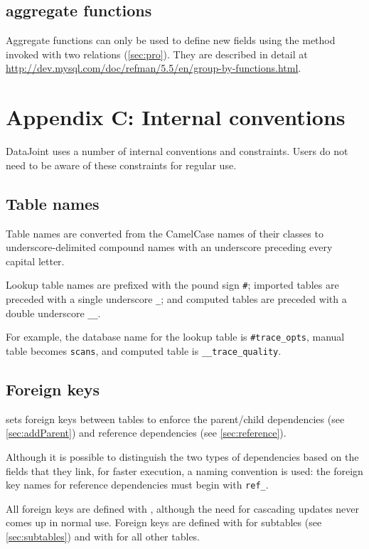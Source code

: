 \documentclass[10pt]{article}
\begin{document}
\subsection{aggregate functions}
Aggregate functions can only be used to define new fields using the  method invoked with two relations (\autoref{sec:pro}).  They are described in detail at \url{http://dev.mysql.com/doc/refman/5.5/en/group-by-functions.html}.

\newpage\section{Appendix C: Internal conventions}
DataJoint uses a number of internal conventions and constraints. Users do not need to be aware of these constraints for regular use.

\subsection{Table names}
Table names are converted from the CamelCase names of their classes to underscore-delimited compound names with an underscore preceding every capital letter.

Lookup table names are prefixed with the pound sign {\tt \#}; imported tables are preceded with a single underscore {\tt\_}; and computed tables are preceded with a double underscore {\tt \_\_}. 

For example, the database name for the lookup table  is {\tt \#trace\_opts}, manual table  becomes {\tt scans}, and computed table  is {\tt \_\_trace\_quality}.

\subsection{Foreign keys}
 sets foreign keys between tables to enforce the parent/child dependencies (see \autoref{sec:addParent}) and reference dependencies (see \autoref{sec:reference}).  

Although it is possible to distinguish the two types of dependencies based on the fields that they link, for faster execution, a naming convention is used: the foreign key names for reference dependencies must begin with {\tt ref\_}. 

All foreign keys are defined with , although the need for cascading updates never comes up in normal use.  Foreign keys are defined with  for subtables (see \autoref{sec:subtables}) and with  for all other tables.  
\end{document}
